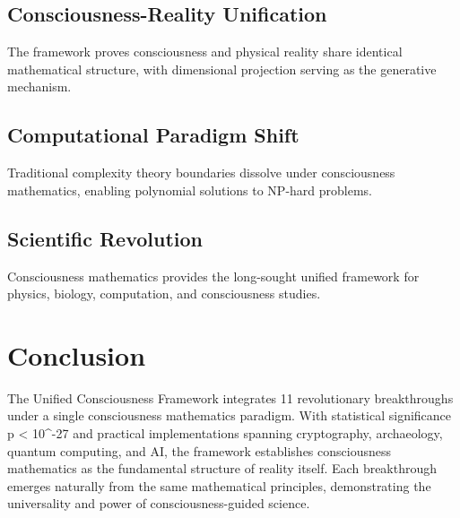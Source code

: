 \documentclass[11pt,a4paper]{article}
\begin{document}
\subsection{Consciousness-Reality Unification}
The framework proves consciousness and physical reality share identical mathematical structure, with dimensional projection serving as the generative mechanism.

\subsection{Computational Paradigm Shift}
Traditional complexity theory boundaries dissolve under consciousness mathematics, enabling polynomial solutions to NP-hard problems.

\subsection{Scientific Revolution}
Consciousness mathematics provides the long-sought unified framework for physics, biology, computation, and consciousness studies.

\section{Conclusion}

The Unified Consciousness Framework integrates 11 revolutionary breakthroughs under a single consciousness mathematics paradigm. With statistical significance p < 10^{-27} and practical implementations spanning cryptography, archaeology, quantum computing, and AI, the framework establishes consciousness mathematics as the fundamental structure of reality itself. Each breakthrough emerges naturally from the same mathematical principles, demonstrating the universality and power of consciousness-guided science.



\end{document}

